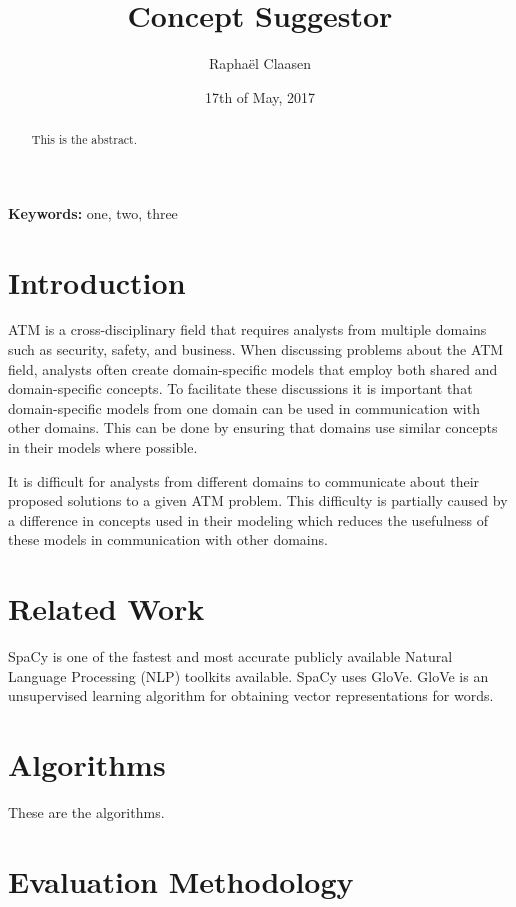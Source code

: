 \documentclass{article}
\title{Concept Suggestor}
\date{17th of May, 2017}
\author{Rapha\"el Claasen}
\begin{document}
\maketitle

\begin{abstract}
This is the abstract.
\end{abstract}

{\bf Keywords:} one, two, three

\section{Introduction}

ATM is a cross-disciplinary field that requires analysts from multiple domains such as security, safety, and business. When discussing problems about the ATM field, analysts often create domain-specific models that employ both shared and domain-specific concepts. To facilitate these discussions it is important that domain-specific models from one domain can be used in communication with other domains. This can be done by ensuring that domains use similar concepts in their models where possible.

It is difficult for analysts from different domains to communicate about their proposed solutions to a given ATM problem. This difficulty is partially caused by a difference in concepts used in their modeling which reduces the usefulness of these models in communication with other domains.

\section{Related Work}

SpaCy is one of the fastest and most accurate publicly available Natural Language Processing (NLP) toolkits available.\cite{choi2015depends}
SpaCy uses GloVe. GloVe is an unsupervised learning algorithm for obtaining vector representations for words.\cite{pennington2014glove}

\section{Algorithms}

These are the algorithms.

\section{Evaluation Methodology}
\end{document}
